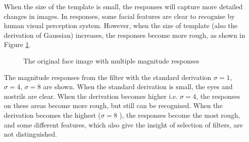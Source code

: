 When the size of the template is small, the responses will capture more detailed changes in images. In responses, some facial features are clear to recognise by human visual perception system. However, when the size of template (also the derivation of Gaussian) increases, the responses become more rough, as shown in \mbox{Figure} \ref{fig:multimagreponse}.
\begin{figure}[ht]
\begin{center}
\caption{The original face image with multiple magnitude responses}
\label{fig:multimagreponse}
\end{center}
\end{figure} 
The magnitude responses from the filter with the standard derivation $\sigma=1$, $\sigma=4$, $\sigma=8$ are shown. When the standard derivation is small, the eyes and nostrils are clear. When the derivation becomes higher i.e. $\sigma=4$, the responses on these areas become more rough, but still can be recognised. When the derivation becomes the highest ($\sigma=8$ ), the responses become the most rough, and some different features, which also give the insight of selection of filters, are not distinguished.

